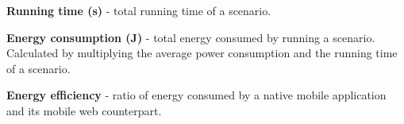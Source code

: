 \textbf{Running time (s)} - total running time of a scenario.

\textbf{Energy consumption (J)} - total energy consumed by running a scenario. Calculated by multiplying the average power consumption and the running time of a scenario.

\textbf{Energy efficiency} - ratio of energy consumed by a native mobile application and its mobile web counterpart.



